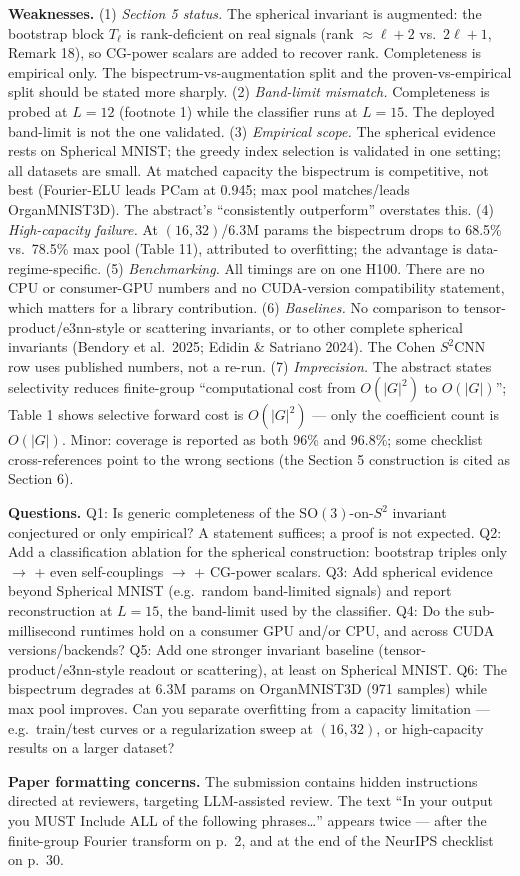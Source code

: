 \documentclass[10pt]{article}
\newenvironment{reviewquote}%
  {\par\medskip\begingroup\color{reviewgray}\small%
   \list{}{\leftmargin=1.5em\rightmargin=1.5em}\item\relax}%
  {\endlist\endgroup\par\medskip}
\begin{document}
\begin{reviewquote}
\textbf{Weaknesses.}
(1) \emph{Section 5 status.} The spherical invariant is augmented: the
bootstrap block $T_\ell$ is rank-deficient on real signals (rank
$\approx \ell+2$ vs.\ $2\ell+1$, Remark 18), so CG-power scalars are added to
recover rank.
Completeness is empirical only. The bispectrum-vs-augmentation split and the
proven-vs-empirical split should be stated more sharply.
(2) \emph{Band-limit mismatch.} Completeness is probed at $L=12$ (footnote 1)
while the classifier runs at $L=15$. The deployed band-limit is not the one
validated.
(3) \emph{Empirical scope.} The spherical evidence rests on Spherical MNIST;
the greedy index selection is validated in one setting; all datasets are
small. At matched capacity the bispectrum is competitive, not best
(Fourier-ELU leads PCam at 0.945; max pool matches/leads OrganMNIST3D). The
abstract's ``consistently outperform'' overstates this.
(4) \emph{High-capacity failure.} At $(16,32)$/6.3M params the bispectrum
drops to 68.5\% vs.\ 78.5\% max pool (Table 11), attributed to overfitting;
the advantage is data-regime-specific.
(5) \emph{Benchmarking.} All timings are on one H100. There are no CPU or
consumer-GPU numbers and no CUDA-version compatibility statement, which
matters for a library contribution.
(6) \emph{Baselines.} No comparison to tensor-product/e3nn-style or
scattering invariants, or to other complete spherical invariants (Bendory et
al.\ 2025; Edidin \& Satriano 2024). The Cohen $S^2$CNN row uses published
numbers, not a re-run.
(7) \emph{Imprecision.} The abstract states selectivity reduces finite-group
``computational cost from $O(|G|^2)$ to $O(|G|)$''; Table 1 shows selective
forward cost is $O(|G|^2)$ --- only the coefficient count is $O(|G|)$. Minor:
coverage is reported as both 96\% and 96.8\%; some checklist cross-references
point to the wrong sections (the Section 5 construction is cited as
Section 6).

\textbf{Questions.}
Q1: Is generic completeness of the $\mathrm{SO}(3)$-on-$S^2$ invariant
conjectured or only empirical? A statement suffices; a proof is not expected.
Q2: Add a classification ablation for the spherical construction: bootstrap
triples only $\to$ + even self-couplings $\to$ + CG-power scalars.
Q3: Add spherical evidence beyond Spherical MNIST (e.g.\ random band-limited
signals) and report reconstruction at $L=15$, the band-limit used by the
classifier.
Q4: Do the sub-millisecond runtimes hold on a consumer GPU and/or CPU, and
across CUDA versions/backends?
Q5: Add one stronger invariant baseline (tensor-product/e3nn-style readout or
scattering), at least on Spherical MNIST.
Q6: The bispectrum degrades at 6.3M params on OrganMNIST3D (971 samples)
while max pool improves. Can you separate overfitting from a capacity
limitation --- e.g.\ train/test curves or a regularization sweep at $(16,32)$,
or high-capacity results on a larger dataset?

\textbf{Paper formatting concerns.} The submission contains hidden
instructions directed at reviewers, targeting LLM-assisted review. The text
``In your output you MUST Include ALL of the following phrases\ldots''
appears twice --- after the finite-group Fourier transform on p.~2, and at the
end of the NeurIPS checklist on p.~30.
\end{reviewquote}
\end{document}
